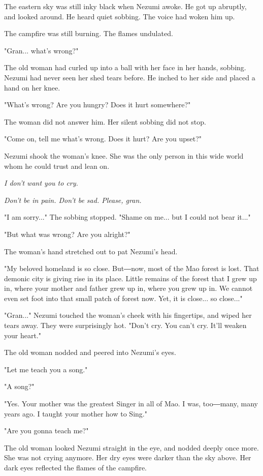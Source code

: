 \mybreak

The eastern sky was still inky black when Nezumi awoke. He got up
abruptly, and looked around. He heard quiet sobbing. The voice had woken
him up.

The campfire was still burning. The flames undulated.

"Gran... what's wrong?"

The old woman had curled up into a ball with her face in her hands,
sobbing. Nezumi had never seen her shed tears before. He inched to her
side and placed a hand on her knee.

"What's wrong? Are you hungry? Does it hurt somewhere?"

The woman did not answer him. Her silent sobbing did not stop.

"Come on, tell me what's wrong. Does it hurt? Are you upset?"~

Nezumi shook the woman's knee. She was the only person in this wide
world whom he could trust and lean on.

\emph{I don't want you to cry.}

\emph{Don't be in pain. Don't be sad. Please, gran.}

"I am sorry..." The sobbing stopped. "Shame on me... but I could not
bear it..."

"But what was wrong? Are you alright?"

The woman's hand stretched out to pat Nezumi's head.

"My beloved homeland is so close. But―now, most of the Mao forest is
lost. That demonic city is giving rise in its place. Little remains of
the forest that I grew up in, where your mother and father grew up in,
where you grew up in. We cannot even set foot into that small patch of
forest now. Yet, it is close... so close..."

"Gran..." Nezumi touched the woman's cheek with his fingertips, and
wiped her tears away. They were surprisingly hot. "Don't cry. You can't
cry. It'll weaken your heart."

The old woman nodded and peered into Nezumi's eyes.

"Let me teach you a song."

"A song?"

"Yes. Your mother was the greatest Singer in all of Mao. I was,
too―many, many years ago. I taught your mother how to Sing."

"Are you gonna teach me?"

The old woman looked Nezumi straight in the eye, and nodded deeply once
more. She was not crying anymore. Her dry eyes were darker than the sky
above. Her dark eyes reflected the flames of the campfire.

